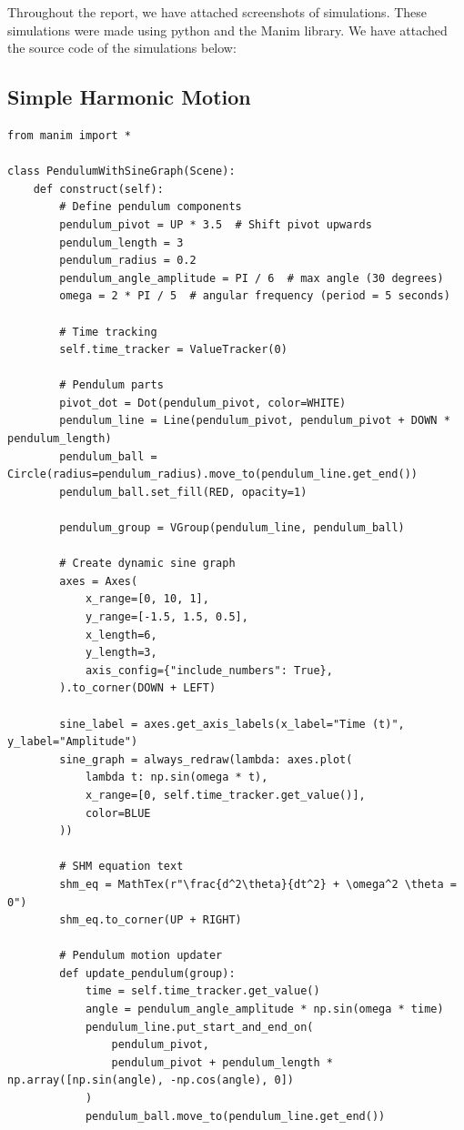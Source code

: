 \documentclass[12pt,a4paper]{article}
\begin{document}
Throughout the report, we have attached screenshots of simulations. These simulations were made using python and the Manim library. We have attached the source code of the simulations below:

\subsection{Simple Harmonic Motion}

\begin{verbatim}  
from manim import *

class PendulumWithSineGraph(Scene):
    def construct(self):
        # Define pendulum components
        pendulum_pivot = UP * 3.5  # Shift pivot upwards
        pendulum_length = 3
        pendulum_radius = 0.2
        pendulum_angle_amplitude = PI / 6  # max angle (30 degrees)
        omega = 2 * PI / 5  # angular frequency (period = 5 seconds)

        # Time tracking
        self.time_tracker = ValueTracker(0)

        # Pendulum parts
        pivot_dot = Dot(pendulum_pivot, color=WHITE)
        pendulum_line = Line(pendulum_pivot, pendulum_pivot + DOWN * pendulum_length)
        pendulum_ball = Circle(radius=pendulum_radius).move_to(pendulum_line.get_end())
        pendulum_ball.set_fill(RED, opacity=1)

        pendulum_group = VGroup(pendulum_line, pendulum_ball)

        # Create dynamic sine graph
        axes = Axes(
            x_range=[0, 10, 1],
            y_range=[-1.5, 1.5, 0.5],
            x_length=6,
            y_length=3,
            axis_config={"include_numbers": True},
        ).to_corner(DOWN + LEFT)

        sine_label = axes.get_axis_labels(x_label="Time (t)", y_label="Amplitude")
        sine_graph = always_redraw(lambda: axes.plot(
            lambda t: np.sin(omega * t),
            x_range=[0, self.time_tracker.get_value()],
            color=BLUE
        ))

        # SHM equation text
        shm_eq = MathTex(r"\frac{d^2\theta}{dt^2} + \omega^2 \theta = 0")
        shm_eq.to_corner(UP + RIGHT)

        # Pendulum motion updater
        def update_pendulum(group):
            time = self.time_tracker.get_value()
            angle = pendulum_angle_amplitude * np.sin(omega * time)
            pendulum_line.put_start_and_end_on(
                pendulum_pivot,
                pendulum_pivot + pendulum_length * np.array([np.sin(angle), -np.cos(angle), 0])
            )
            pendulum_ball.move_to(pendulum_line.get_end())


\end{verbatim}
\end{document}
